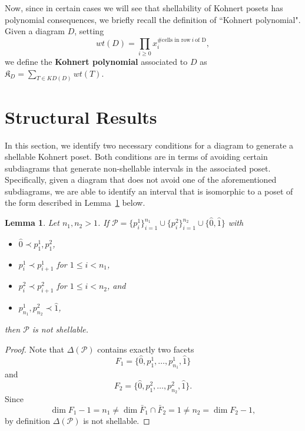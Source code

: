 \documentclass[letterpaper,10pt]{article}
\newtheorem{lemma}[theorem]{Lemma}
\begin{document}
Now, since in certain cases we will see that shellability of Kohnert posets has polynomial consequences, we briefly recall the definition of ``Kohnert polynomial". Given a diagram $D$, setting $$wt(D)=\prod_{i\ge 0}x_i^{\#\text{cells in row}~i~\text{of D}},$$ we define the \textbf{Kohnert polynomial} associated to $D$ as $\mathfrak{K}_D=\displaystyle\sum_{T\in KD(D)}wt(T)$.


\section{Structural Results}\label{sec:strucres}

In this section, we identify two necessary conditions for a diagram to generate a shellable Kohnert poset. Both conditions are in terms of avoiding certain subdiagrams that generate non-shellable intervals in the associated poset. Specifically, given a diagram that does not avoid one of the aforementioned subdiagrams, we are able to identify an interval that is isomorphic to a poset of the form described in Lemma~\ref{lem:nonshellp} below.


\begin{lemma}\label{lem:nonshellp}
Let $n_1,n_2>1$. If $\mathcal{P}=\{p_i^1\}_{i=1}^{n_1}\cup\{p_i^2\}_{i=1}^{n_2}\cup\{\hat{0},\hat{1}\}$ with 
\begin{itemize}
    \item $\hat{0}\prec p_1^1,p^2_1$,
    \item $p_i^1\prec p_{i+1}^1$ for $1\le i<n_1$,
    \item $p_i^2\prec p_{i+1}^2$ for $1\le i<n_2$, and
    \item $p_{n_1}^1,p_{n_2}^2\prec\hat{1}$,
\end{itemize}
then $\mathcal{P}$ is not shellable.
\end{lemma}
\begin{proof}
Note that $\Delta(\mathcal{P})$ contains exactly two facets $$F_1=\{\hat{0},p_1^1,\hdots,p_{n_1}^1,\hat{1}\}$$ and $$F_2=\{\hat{0},p_1^2,\hdots,p_{n_2}^2,\hat{1}\}.$$ Since $$\dim F_1-1=n_1\neq \dim \bar{F}_1\cap \bar{F}_2=1\neq n_2=\dim F_2-1,$$ by definition $\Delta(\mathcal{P})$ is not shellable.
\end{proof}
\end{document}
